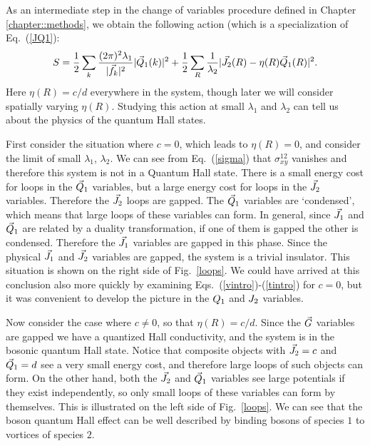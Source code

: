 As an intermediate step in the change of variables procedure defined in Chapter \ref{chapter::methods}, we obtain the following action (which is a specialization of Eq.~(\ref{JQ1}):
\begin{eqnarray}
S = \frac{1}{2}\sum_{k} \frac{(2\pi)^2\lambda_1}{|\vec{f}_k|^2 } |\vec{Q}_1(k)|^2\label{JQreal}
+ \frac{1}{2}\sum_{R} \frac{1}{\lambda_2} |\vec{J}_2(R) - \eta(R)\vec{Q}_1(R)|^2.\nonumber
\end{eqnarray}
Here $\eta(R)=c/d$ everywhere in the system, though later we will consider spatially varying $\eta(R)$. Studying this action at small $\lambda_1$ and $\lambda_2$ can tell us about the physics of the quantum Hall states.

First consider the situation where $c=0$, which leads to $\eta(R)=0$, and consider the limit of small $\lambda_1$, $\lambda_2$. We can see from Eq.~(\ref{sigma}) that $\sigma^{12}_{xy}$ vanishes and therefore this system is not in a Quantum Hall state. 
There is a small energy cost for loops in the $\vec{Q}_1$ variables, but a large energy cost for loops in the $\vec{J}_2$ variables. Therefore the $\vec{J}_2$ loops are gapped. The $\vec{Q}_1$ variables are `condensed', which means that large loops of these variables can form. In general, since $\vec{J}_1$ and $\vec{Q}_1$ are related by a duality transformation, if one of them is gapped the other is condensed. Therefore the $\vec{J}_1$ variables are gapped in this phase. Since the physical $\vec{J}_1$ and $\vec{J}_2$ variables are gapped, the system is a trivial insulator. This situation is shown on the right side of Fig.~\ref{loops}.  We could have arrived at this conclusion also more quickly by examining Eqs.~(\ref{vintro})-(\ref{tintro}) for $c=0$, but it was convenient to develop the picture in the $Q_1$ and $J_2$ variables.

Now consider the case where $c\neq0$, so that $\eta(R)=c/d$. Since the $\vec{G}$ variables are gapped we have a quantized Hall conductivity, and the system is in the bosonic quantum Hall state.
Notice that composite objects with $\vec{J}_2=c$ and $\vec{Q}_1=d$ see a very small energy cost, and therefore large loops of such objects can form.  On the other hand, both the $\vec{J}_2$ and $\vec{Q}_1$ variables see large potentials if they exist independently, so only small loops of these variables can form by themselves. This is illustrated on the left side of Fig.~\ref{loops}. We can see that the boson quantum Hall effect can be well described by binding bosons of species $1$ to vortices of species $2$. 

